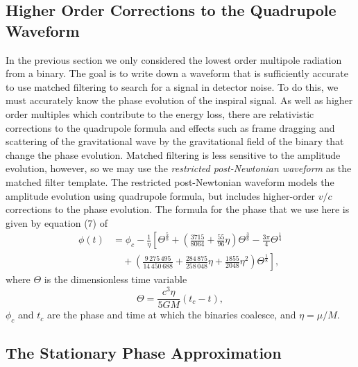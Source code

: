 \subsection{Higher Order Corrections to the Quadrupole Waveform}

In the previous section we only considered the lowest order multipole
radiation from a binary. The goal is to write down a waveform that is
sufficiently accurate to use matched filtering to search for a signal in
detector noise. To do this, we must accurately know the phase evolution of the
inspiral signal. As well as higher order multiples which contribute to the
energy loss, there are relativistic corrections to the quadrupole formula and
effects such as frame dragging and scattering of the gravitational wave by the
gravitational field of the binary that change the phase evolution. Matched
filtering is less sensitive to the amplitude evolution, however, so we may use
the \emph{restricted post-Newtonian waveform} as the matched filter template.
The restricted post-Newtonian waveform models the amplitude evolution using
quadrupole formula, but includes higher-order $v/c$ corrections to the phase
evolution. The formula for the phase that we use here is given by equation (7)
of \cite{Blanchet:1996pi}
\begin{equation}
\begin{split}
\phi(t) &= \phi_c - \frac{1}{\eta} \left[ 
\Theta^\frac{5}{8} + \left(\frac{3715}{8064} + \frac{55}{96}\eta\right)
\Theta^\frac{3}{8} - \frac{3\pi}{4} \Theta^\frac{1}{4} \right. \\
&\quad 
+\left. \left(\frac{9\,275\,495}{14\,450\,688} + \frac{284\,875}{258\,048}\eta +
\frac{1855}{2048} \eta^2\right) \Theta^\frac{1}{8} \right],
\label{eq:biwwphase}
\end{split}
\end{equation}
where $\Theta$ is the dimensionless time variable
\begin{equation}
\Theta = \frac{c^3\eta}{5GM}(t_c - t),
\end{equation}
$\phi_c$ and $t_c$ are the phase and time at which the binaries coalesce, and
$\eta = \mu / M$.

\subsection{The Stationary Phase Approximation}
\label{ss:stationaryphase}

